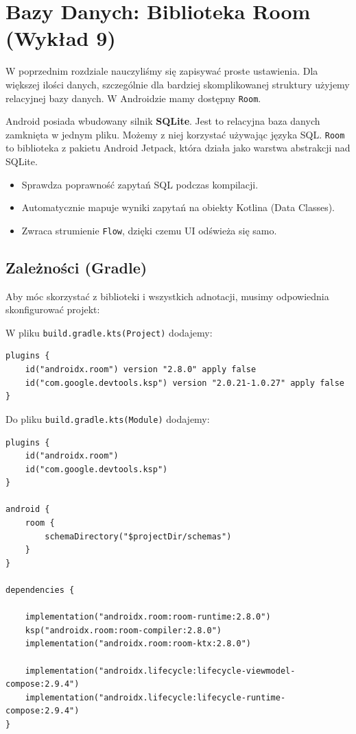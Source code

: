 \chapter{Bazy Danych: Biblioteka Room (Wykład 9)}

W poprzednim rozdziale nauczyliśmy się zapisywać proste ustawienia. Dla większej ilości danych, szczególnie dla bardziej skomplikowanej struktury użyjemy relacyjnej bazy danych. W Androidzie mamy dostępny \texttt{Room}.

Android posiada wbudowany silnik \textbf{SQLite}. Jest to relacyjna baza danych zamknięta w jednym pliku. Możemy z niej korzystać używając języka SQL. \texttt{Room} to biblioteka z pakietu Android Jetpack, która działa jako warstwa abstrakcji nad SQLite.
\begin{itemize}
    \item Sprawdza poprawność zapytań SQL podczas kompilacji.
    \item Automatycznie mapuje wyniki zapytań na obiekty Kotlina (Data Classes).
    \item Zwraca strumienie \texttt{Flow}, dzięki czemu UI odświeża się samo.
\end{itemize}

\section{Zależności (Gradle)}

Aby móc skorzystać z biblioteki i wszystkich adnotacji, musimy odpowiednia skonfigurować projekt:

W pliku \texttt{build.gradle.kts(Project)} dodajemy:

\begin{verbatim}
plugins {
    id("androidx.room") version "2.8.0" apply false
    id("com.google.devtools.ksp") version "2.0.21-1.0.27" apply false
}
\end{verbatim}

Do pliku \texttt{build.gradle.kts(Module)} dodajemy:

\begin{verbatim}
plugins {
    id("androidx.room")
    id("com.google.devtools.ksp")
}

android {
    room {
        schemaDirectory("$projectDir/schemas")
    }
}

dependencies {

    implementation("androidx.room:room-runtime:2.8.0")
    ksp("androidx.room:room-compiler:2.8.0")
    implementation("androidx.room:room-ktx:2.8.0")

    implementation("androidx.lifecycle:lifecycle-viewmodel-compose:2.9.4")
    implementation("androidx.lifecycle:lifecycle-runtime-compose:2.9.4")
}
\end{verbatim}

